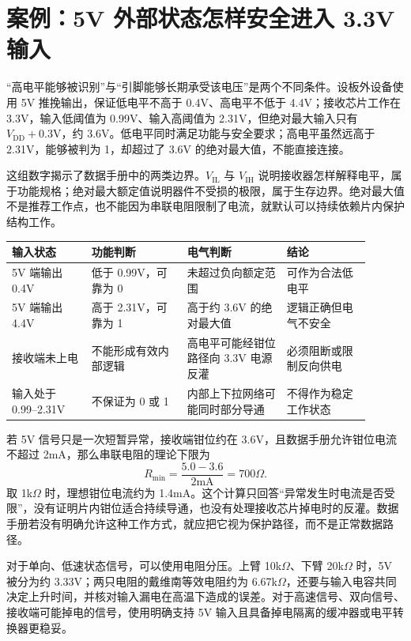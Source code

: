 \section{案例：5V 外部状态怎样安全进入 3.3V 输入}

“高电平能够被识别”与“引脚能够长期承受该电压”是两个不同条件。设板外设备使用 5V 推挽输出，保证低电平不高于 0.4V、高电平不低于 4.4V；接收芯片工作在 3.3V，输入低阈值为 0.99V、输入高阈值为 2.31V，但绝对最大输入只有 $V_{\mathrm{DD}}+0.3\mathrm{V}$，约 3.6V。低电平同时满足功能与安全要求；高电平虽然远高于 2.31V，能够被判为 1，却超过了 3.6V 的绝对最大值，不能直接连接。

这组数字揭示了数据手册中的两类边界。$V_{\mathrm{IL}}$ 与 $V_{\mathrm{IH}}$ 说明接收器怎样解释电平，属于功能规格；绝对最大额定值说明器件不受损的极限，属于生存边界。绝对最大值不是推荐工作点，也不能因为串联电阻限制了电流，就默认可以持续依赖片内保护结构工作。

\begin{longtable}{L{0.20\linewidth}L{0.24\linewidth}L{0.25\linewidth}L{0.21\linewidth}}
\toprule
输入状态 & 功能判断 & 电气判断 & 结论 \\
\midrule
5V 端输出 0.4V & 低于 0.99V，可靠为 0 & 未超过负向额定范围 & 可作为合法低电平 \\\tablerowrule
5V 端输出 4.4V & 高于 2.31V，可靠为 1 & 高于约 3.6V 的绝对最大值 & 逻辑正确但电气不安全 \\\tablerowrule
接收端未上电 & 不能形成有效内部逻辑 & 高电平可能经钳位路径向 3.3V 电源反灌 & 必须阻断或限制反向供电 \\\tablerowrule
输入处于 0.99--2.31V & 不保证为 0 或 1 & 内部上下拉网络可能同时部分导通 & 不得作为稳定工作状态 \\
\bottomrule
\end{longtable}


若 5V 信号只是一次短暂异常，接收端钳位约在 3.6V，且数据手册允许钳位电流不超过 2mA，那么串联电阻的理论下限为
\[
  R_{\min}=\frac{5.0-3.6}{2\mathrm{mA}}=700\Omega.
\]
取 1k$\Omega$ 时，理想钳位电流约为 1.4mA。这个计算只回答“异常发生时电流是否受限”，没有证明片内钳位适合持续导通，也没有处理接收芯片掉电时的反灌。数据手册若没有明确允许这种工作方式，就应把它视为保护路径，而不是正常数据路径。

对于单向、低速状态信号，可以使用电阻分压。上臂 10k$\Omega$、下臂 20k$\Omega$ 时，5V 被分为约 3.33V；两只电阻的戴维南等效电阻约为 6.67k$\Omega$，还要与输入电容共同决定上升时间，并核对输入漏电在高温下造成的误差。对于高速信号、双向信号、接收端可能掉电的信号，使用明确支持 5V 输入且具备掉电隔离的缓冲器或电平转换器更稳妥。

